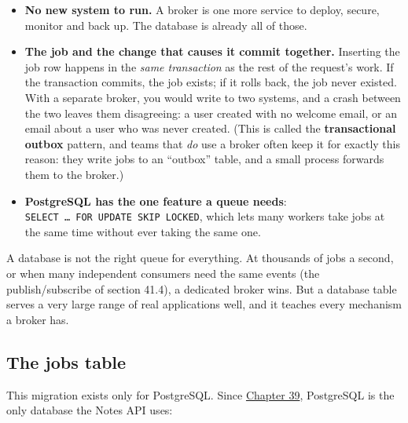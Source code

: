 \begin{itemize}
\tightlist
\item
  \textbf{No new system to run.} A broker is one more service to deploy, secure, monitor and back up. The database is already all of those.
\item
  \textbf{The job and the change that causes it commit together.} Inserting the job row happens in the \emph{same transaction} as the rest of the request's work. If the transaction commits, the job exists; if it rolls back, the job never existed. With a separate broker, you would write to two systems, and a crash between the two leaves them disagreeing: a user created with no welcome email, or an email about a user who was never created. (This is called the \textbf{transactional outbox} pattern, and teams that \emph{do} use a broker often keep it for exactly this reason: they write jobs to an ``outbox'' table, and a small process forwards them to the broker.)
\item
  \textbf{PostgreSQL has the one feature a queue needs}: \texttt{SELECT\ …\ FOR\ UPDATE\ SKIP\ LOCKED}, which lets many workers take jobs at the same time without ever taking the same one.
\end{itemize}

\noindent{}A database is not the right queue for everything. At thousands of jobs a second, or when many independent consumers need the same events (the publish/subscribe of section 41.4), a dedicated broker wins. But a database table serves a very large range of real applications well, and it teaches every mechanism a broker has.

\subsection*{The jobs table}\label{41-event-driven-architecture:the-jobs-table}

This migration exists only for PostgreSQL. Since \hyperref[ch:39-local-vs-production]{Chapter 39}, PostgreSQL is the only database the Notes API uses:

